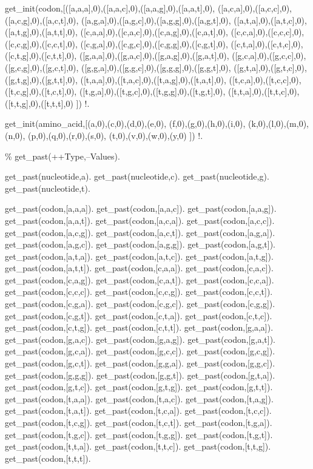 \begin{center}
get_init(codon,[([a,a,a],0),([a,a,c],0),([a,a,g],0),([a,a,t],0),
([a,c,a],0),([a,c,c],0),([a,c,g],0),([a,c,t],0),
([a,g,a],0),([a,g,c],0),([a,g,g],0),([a,g,t],0),
([a,t,a],0),([a,t,c],0),([a,t,g],0),([a,t,t],0),
([c,a,a],0),([c,a,c],0),([c,a,g],0),([c,a,t],0),
([c,c,a],0),([c,c,c],0),([c,c,g],0),([c,c,t],0),
([c,g,a],0),([c,g,c],0),([c,g,g],0),([c,g,t],0),
([c,t,a],0),([c,t,c],0),([c,t,g],0),([c,t,t],0),
([g,a,a],0),([g,a,c],0),([g,a,g],0),([g,a,t],0),
([g,c,a],0),([g,c,c],0),([g,c,g],0),([g,c,t],0),
([g,g,a],0),([g,g,c],0),([g,g,g],0),([g,g,t],0),
([g,t,a],0),([g,t,c],0),([g,t,g],0),([g,t,t],0),
([t,a,a],0),([t,a,c],0),([t,a,g],0),([t,a,t],0),
([t,c,a],0),([t,c,c],0),([t,c,g],0),([t,c,t],0),
([t,g,a],0),([t,g,c],0),([t,g,g],0),([t,g,t],0),
([t,t,a],0),([t,t,c],0),([t,t,g],0),([t,t,t],0)
]) \Sneck{}
!.
\end{center}

\begin{center}
get_init(amino_acid,[(a,0),(c,0),(d,0),(e,0),
(f,0),(g,0),(h,0),(i,0),
(k,0),(l,0),(m,0),(n,0),
(p,0),(q,0),(r,0),(s,0),
(t,0),(v,0),(w,0),(y,0)
])\Sneck{}
!.
\end{center}

\% get_past(++Type,--Values).

get_past(nucleotide,a).
get_past(nucleotide,c).
get_past(nucleotide,g).
get_past(nucleotide,t).

get_past(codon,[a,a,a]).
get_past(codon,[a,a,c]).
get_past(codon,[a,a,g]).
get_past(codon,[a,a,t]).
get_past(codon,[a,c,a]).
get_past(codon,[a,c,c]).
get_past(codon,[a,c,g]).
get_past(codon,[a,c,t]).
get_past(codon,[a,g,a]).
get_past(codon,[a,g,c]).
get_past(codon,[a,g,g]).
get_past(codon,[a,g,t]).
get_past(codon,[a,t,a]).
get_past(codon,[a,t,c]).
get_past(codon,[a,t,g]).
get_past(codon,[a,t,t]).
get_past(codon,[c,a,a]).
get_past(codon,[c,a,c]).
get_past(codon,[c,a,g]).
get_past(codon,[c,a,t]).
get_past(codon,[c,c,a]).
get_past(codon,[c,c,c]).
get_past(codon,[c,c,g]).
get_past(codon,[c,c,t]).
get_past(codon,[c,g,a]).
get_past(codon,[c,g,c]).
get_past(codon,[c,g,g]).
get_past(codon,[c,g,t]).
get_past(codon,[c,t,a]).
get_past(codon,[c,t,c]).
get_past(codon,[c,t,g]).
get_past(codon,[c,t,t]).
get_past(codon,[g,a,a]).
get_past(codon,[g,a,c]).
get_past(codon,[g,a,g]).
get_past(codon,[g,a,t]).
get_past(codon,[g,c,a]).
get_past(codon,[g,c,c]).
get_past(codon,[g,c,g]).
get_past(codon,[g,c,t]).
get_past(codon,[g,g,a]).
get_past(codon,[g,g,c]).
get_past(codon,[g,g,g]).
get_past(codon,[g,g,t]).
get_past(codon,[g,t,a]).
get_past(codon,[g,t,c]).
get_past(codon,[g,t,g]).
get_past(codon,[g,t,t]).
get_past(codon,[t,a,a]).
get_past(codon,[t,a,c]).
get_past(codon,[t,a,g]).
get_past(codon,[t,a,t]).
get_past(codon,[t,c,a]).
get_past(codon,[t,c,c]).
get_past(codon,[t,c,g]).
get_past(codon,[t,c,t]).
get_past(codon,[t,g,a]).
get_past(codon,[t,g,c]).
get_past(codon,[t,g,g]).
get_past(codon,[t,g,t]).
get_past(codon,[t,t,a]).
get_past(codon,[t,t,c]).
get_past(codon,[t,t,g]).
get_past(codon,[t,t,t]).

